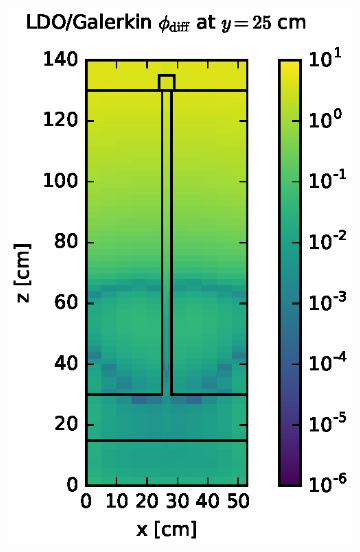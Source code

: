 \documentclass{article} %
\begin{document}
\begin{figure}[!htb]
\begin{subfigure}{0.4\textwidth}
\includegraphics[max height=0.445\textheight]
{steel-flux-diff-galerkin.eps}
\end{subfigure}
\\
\begin{subfigure}{0.4\textwidth}

\end{subfigure}
\end{figure}
\end{document}
